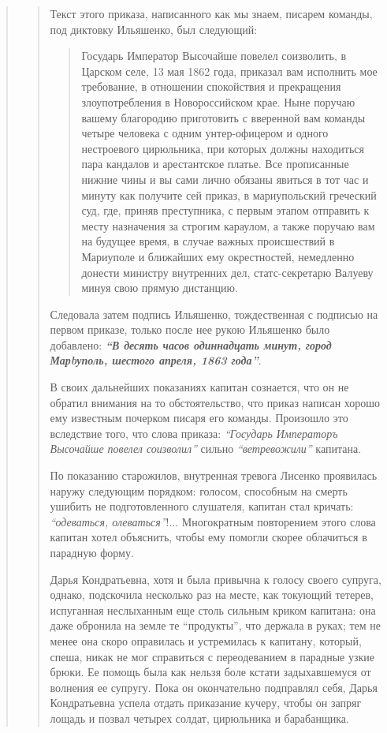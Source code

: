\begin{quote}
\begin{quote}
\begin{quote}
\end{quote}

Текст этого приказа, написанного как мы знаем, писарем
команды, под диктовку Ильяшенко, был следующий: 

\begin{quote}
\em\bfseries

Государь Император Высочайше повелел соизволить, в Царском селе, 13 мая 1862
года, приказал вам исполнить мое требование, в отношении спокойствия и
прекращения злоупотребления в Новороссийском крае. Ныне поручаю вашему
благородию приготовить с вверенной вам команды четыре человека с одним
унтер-офицером и одного нестроевого цирюльника, при которых должны
находиться пара кандалов и арестантское платье. Все прописанные нижние
чины и вы сами лично обязаны явиться в тот час и минуту как получите
сей приказ, в мариупольский греческий суд, где, приняв преступника, с
первым этапом отправить к месту назначения за строгим караулом, а также
поручаю вам на будущее время, в случае важных происшествий в Мариуполе
и ближайших ему окрестностей, немедленно донести министру внутренних
дел, статс-секретарю Валуеву минуя свою прямую дистанцию.
	
\end{quote}
Следовала
затем подпись Ильяшенко, тождественная с подписью на
первом приказе, только после нее рукою Ильяшенко было
добавлено: \textbf{\em ``В десять часов одиннадцать минут, город
Марbуполь, шестого апреля, 1863 года''}.

В своих дальнейших показаниях капитан сознается, 
что он не обратил внимания на то обстоятельство,
что приказ написан хорошо ему известным почерком
писаря его команды. Произошло это вследствие того, что
слова приказа: \emph{``Государь Императоръ Высочайше повелел
соизволил''} сильно \emph{``ветревожили''} капитана.

По показанию старожилов, внутренная тревога Лисенко
проявилась наружу следующим порядком: голосом, способным на смерть ушибить 
не подготовленного слушателя,
капитан стал кричать: \emph{``одеваться, олеваться''}!... Многократным
повторением этого слова капитан хотел объяснить, 
чтобы ему помогли скорее облачиться в парадную форму.

Дарья Кондратьевна, хотя и была привычна к голосу своего супруга, однако,
подскочила несколько раз на месте, как токующий тетерев, испуганная неслыханным
еще столь сильным криком капитана: она даже обронила на земле те ``продукты'',
что держала в руках; тем не менее она скоро оправилась и устремилась к
капитану, который, спеша, никак не мог справиться с переодеванием в парадные
узкие брюки.  Ее помощь была как нельзя боле кстати задыхавшемуся от волнения
ее супругу.  Пока он окончательно подправлял себя, Дарья Кондратьевна успела
отдать приказание кучеру, чтобы он запряг лощадь и позвал четырех солдат,
цирюльника и барабанщика.


\end{quote}
\end{quote}
